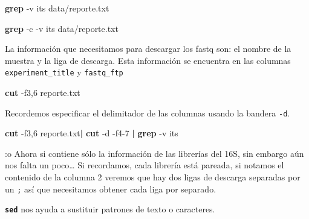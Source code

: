 \documentclass[
]{book}
\newenvironment{Shaded}{\begin{snugshade}}{\end{snugshade}}
\newcommand{\AttributeTok}[1]{\textcolor[rgb]{0.13,0.29,0.53}{#1}}
\newcommand{\FunctionTok}[1]{\textcolor[rgb]{0.13,0.29,0.53}{\textbf{#1}}}
\newcommand{\KeywordTok}[1]{\textcolor[rgb]{0.13,0.29,0.53}{\textbf{#1}}}
\newcommand{\NormalTok}[1]{#1}
\newcommand{\StringTok}[1]{\textcolor[rgb]{0.31,0.60,0.02}{#1}}
\begin{document}
\begin{Shaded}
\begin{Highlighting}[]
\FunctionTok{grep} \AttributeTok{{-}v} \StringTok{\textquotesingle{}its\textquotesingle{}}\NormalTok{ data/reporte.txt}
\end{Highlighting}
\end{Shaded}

\begin{Shaded}
\begin{Highlighting}[]
\FunctionTok{grep} \AttributeTok{{-}c} \AttributeTok{{-}v} \StringTok{\textquotesingle{}its\textquotesingle{}}\NormalTok{ data/reporte.txt}
\end{Highlighting}
\end{Shaded}

La información que necesitamos para descargar los fastq son: el nombre de la muestra y la liga de descarga. Esta información se encuentra en las columnas \texttt{experiment\_title} y \texttt{fastq\_ftp}

\begin{Shaded}
\begin{Highlighting}[]
\FunctionTok{cut} \AttributeTok{{-}f3,6}\NormalTok{ reporte.txt}
\end{Highlighting}
\end{Shaded}

Recordemos especificar el delimitador de las columnas usando la bandera \texttt{-d}.

\begin{Shaded}
\begin{Highlighting}[]
\FunctionTok{cut} \AttributeTok{{-}f3,6}\NormalTok{ reporte.txt}\KeywordTok{|} \FunctionTok{cut} \AttributeTok{{-}d}\StringTok{\textquotesingle{} \textquotesingle{}} \AttributeTok{{-}f4{-}7} \KeywordTok{|} \FunctionTok{grep} \AttributeTok{{-}v} \StringTok{\textquotesingle{}its\textquotesingle{}}
\end{Highlighting}
\end{Shaded}

:o Ahora si contiene sólo la información de las librerías del 16S, sin embargo aún nos falta un poco\ldots{}
Si recordamos, cada librería está pareada, si notamos el contenido de la columna 2 veremos que hay dos ligas de descarga separadas por un \texttt{;} así que necesitamos obtener cada liga por separado.

\textbf{\texttt{sed}} nos ayuda a sustituir patrones de texto o caracteres.
\end{document}
